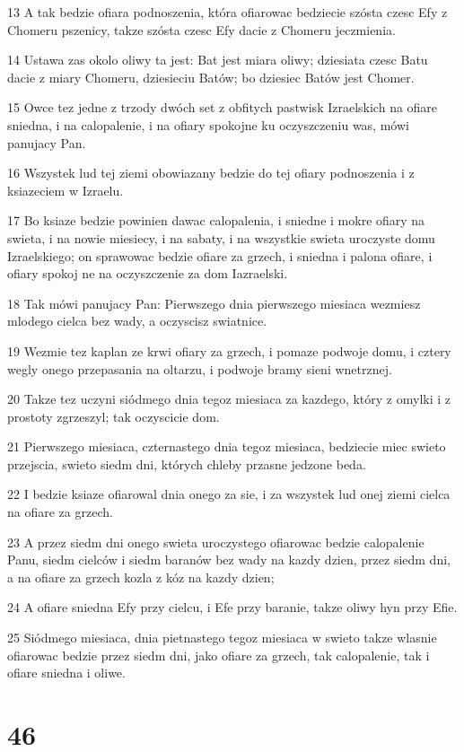 \par 13 A tak bedzie ofiara podnoszenia, która ofiarowac bedziecie szósta czesc Efy z Chomeru pszenicy, takze szósta czesc Efy dacie z Chomeru jeczmienia.
\par 14 Ustawa zas okolo oliwy ta jest: Bat jest miara oliwy; dziesiata czesc Batu dacie z miary Chomeru, dziesieciu Batów; bo dziesiec Batów jest Chomer.
\par 15 Owce tez jedne z trzody dwóch set z obfitych pastwisk Izraelskich na ofiare sniedna, i na calopalenie, i na ofiary spokojne ku oczyszczeniu was, mówi panujacy Pan.
\par 16 Wszystek lud tej ziemi obowiazany bedzie do tej ofiary podnoszenia i z ksiazeciem w Izraelu.
\par 17 Bo ksiaze bedzie powinien dawac calopalenia, i sniedne i mokre ofiary na swieta, i na nowie miesiecy, i na sabaty, i na wszystkie swieta uroczyste domu Izraelskiego; on sprawowac bedzie ofiare za grzech, i sniedna i palona ofiare, i ofiary spokoj ne na oczyszczenie za dom Iazraelski.
\par 18 Tak mówi panujacy Pan: Pierwszego dnia pierwszego miesiaca wezmiesz mlodego cielca bez wady, a oczyscisz swiatnice.
\par 19 Wezmie tez kaplan ze krwi ofiary za grzech, i pomaze podwoje domu, i cztery wegly onego przepasania na oltarzu, i podwoje bramy sieni wnetrznej.
\par 20 Takze tez uczyni siódmego dnia tegoz miesiaca za kazdego, który z omylki i z prostoty zgrzeszyl; tak oczyscicie dom.
\par 21 Pierwszego miesiaca, czternastego dnia tegoz miesiaca, bedziecie miec swieto przejscia, swieto siedm dni, których chleby przasne jedzone beda.
\par 22 I bedzie ksiaze ofiarowal dnia onego za sie, i za wszystek lud onej ziemi cielca na ofiare za grzech.
\par 23 A przez siedm dni onego swieta uroczystego ofiarowac bedzie calopalenie Panu, siedm cielców i siedm baranów bez wady na kazdy dzien, przez siedm dni, a na ofiare za grzech kozla z kóz na kazdy dzien;
\par 24 A ofiare sniedna Efy przy cielcu, i Efe przy baranie, takze oliwy hyn przy Efie.
\par 25 Siódmego miesiaca, dnia pietnastego tegoz miesiaca w swieto takze wlasnie ofiarowac bedzie przez siedm dni, jako ofiare za grzech, tak calopalenie, tak i ofiare sniedna i oliwe.

\chapter{46}

